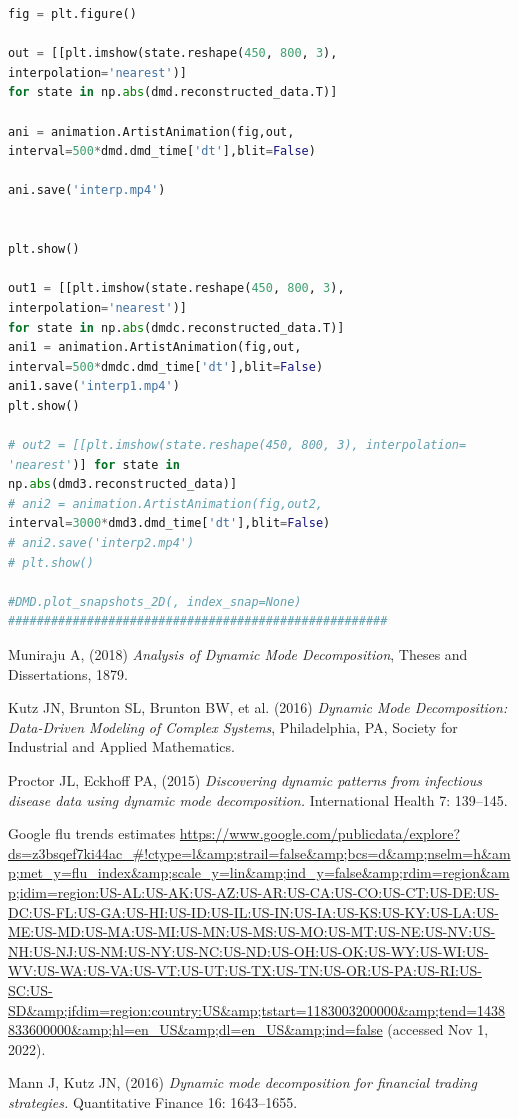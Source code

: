 \documentclass[12pt]{report}
\begin{document}
\begin{lstlisting}[language=python]
fig = plt.figure()

out = [[plt.imshow(state.reshape(450, 800, 3), 
interpolation='nearest')] 
for state in np.abs(dmd.reconstructed_data.T)]

ani = animation.ArtistAnimation(fig,out,
interval=500*dmd.dmd_time['dt'],blit=False)

ani.save('interp.mp4')


plt.show()

out1 = [[plt.imshow(state.reshape(450, 800, 3),
interpolation='nearest')] 
for state in np.abs(dmdc.reconstructed_data.T)]
ani1 = animation.ArtistAnimation(fig,out,
interval=500*dmdc.dmd_time['dt'],blit=False)
ani1.save('interp1.mp4')
plt.show()

# out2 = [[plt.imshow(state.reshape(450, 800, 3), interpolation=
'nearest')] for state in 
np.abs(dmd3.reconstructed_data)]
# ani2 = animation.ArtistAnimation(fig,out2,
interval=3000*dmd3.dmd_time['dt'],blit=False)
# ani2.save('interp2.mp4')
# plt.show()

#DMD.plot_snapshots_2D(, index_snap=None)
#####################################################
\end{lstlisting}

\begin{thebibliography}{9}
Muniraju A, (2018) 
\textit{Analysis of Dynamic Mode Decomposition},
Theses and Dissertations, 1879.

Kutz JN, Brunton SL, Brunton BW, et al. (2016) 
\textit{Dynamic Mode Decomposition: Data-Driven Modeling of Complex Systems}, Philadelphia, PA, Society for Industrial and Applied Mathematics.

Proctor JL, Eckhoff PA, (2015) \textit{Discovering dynamic patterns from infectious disease data using dynamic mode decomposition.} International Health 7: 139–145.

Google flu trends estimates \url{https://www.google.com/publicdata/explore?ds=z3bsqef7ki44ac_#!ctype=l&amp;strail=false&amp;bcs=d&amp;nselm=h&amp;met_y=flu_index&amp;scale_y=lin&amp;ind_y=false&amp;rdim=region&amp;idim=region:US-AL:US-AK:US-AZ:US-AR:US-CA:US-CO:US-CT:US-DE:US-DC:US-FL:US-GA:US-HI:US-ID:US-IL:US-IN:US-IA:US-KS:US-KY:US-LA:US-ME:US-MD:US-MA:US-MI:US-MN:US-MS:US-MO:US-MT:US-NE:US-NV:US-NH:US-NJ:US-NM:US-NY:US-NC:US-ND:US-OH:US-OK:US-WY:US-WI:US-WV:US-WA:US-VA:US-VT:US-UT:US-TX:US-TN:US-OR:US-PA:US-RI:US-SC:US-SD&amp;ifdim=region:country:US&amp;tstart=1183003200000&amp;tend=1438833600000&amp;hl=en_US&amp;dl=en_US&amp;ind=false} (accessed Nov 1, 2022). 

Mann J, Kutz JN, (2016) 
\textit{Dynamic mode decomposition for financial trading strategies.} Quantitative Finance 16: 1643–1655.

\end{thebibliography}
\end{document}
